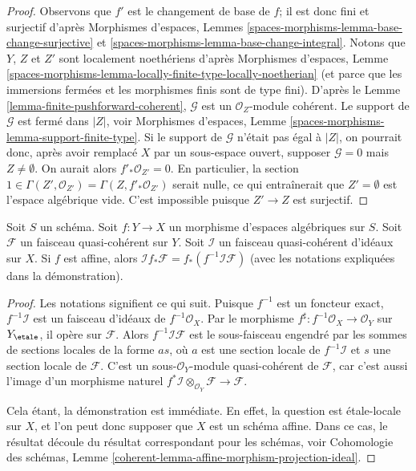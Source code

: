 \begin{proof}
Observons que $f'$ est le changement de base de $f$; il est donc fini
et surjectif d'après Morphismes d'espaces, Lemmes
\ref{spaces-morphisms-lemma-base-change-surjective} et
\ref{spaces-morphisms-lemma-base-change-integral}.
Notons que $Y$, $Z$ et $Z'$ sont localement noethériens d'après
Morphismes d'espaces, Lemme
\ref{spaces-morphisms-lemma-locally-finite-type-locally-noetherian}
(et parce que les immersions fermées et les morphismes finis
sont de type fini). D'après le Lemme \ref{lemma-finite-pushforward-coherent},
$\mathcal{G}$ est un $\mathcal{O}_Z$-module cohérent.
Le support de $\mathcal{G}$ est fermé dans $|Z|$, voir
Morphismes d'espaces, Lemme
\ref{spaces-morphisms-lemma-support-finite-type}.
Si le support de $\mathcal{G}$ n'était pas égal à $|Z|$,
on pourrait donc, après avoir remplacé $X$ par un sous-espace ouvert, supposer
$\mathcal{G} = 0$ mais $Z \not = \emptyset$.
On aurait alors $f'_*\mathcal{O}_{Z'} = 0$. En particulier, la section
$1 \in \Gamma(Z', \mathcal{O}_{Z'}) = \Gamma(Z, f'_*\mathcal{O}_{Z'})$
serait nulle, ce qui entraînerait que $Z' = \emptyset$ est l'espace
algébrique vide. C'est impossible puisque $Z' \to Z$ est surjectif.
\end{proof}

\begin{lemma}
\label{lemma-affine-morphism-projection-ideal}
Soit $S$ un schéma. Soit $f : Y \to X$ un morphisme d'espaces algébriques
sur $S$. Soit $\mathcal{F}$ un faisceau quasi-cohérent sur $Y$.
Soit $\mathcal{I}$ un faisceau quasi-cohérent d'idéaux sur $X$.
Si $f$ est affine, alors
$\mathcal{I}f_*\mathcal{F} = f_*(f^{-1}\mathcal{I}\mathcal{F})$
(avec les notations expliquées dans la démonstration).
\end{lemma}

\begin{proof}
Les notations signifient ce qui suit. Puisque $f^{-1}$ est un foncteur exact,
$f^{-1}\mathcal{I}$ est un faisceau
d'idéaux de $f^{-1}\mathcal{O}_X$. Par le morphisme
$f^\sharp : f^{-1}\mathcal{O}_X \to \mathcal{O}_Y$
sur $Y_\etale$, il opère sur $\mathcal{F}$.
Alors $f^{-1}\mathcal{I}\mathcal{F}$ est le sous-faisceau
engendré par les sommes de sections locales de la forme $as$, où $a$
est une section locale de $f^{-1}\mathcal{I}$ et $s$ une section locale
de $\mathcal{F}$. C'est un sous-$\mathcal{O}_Y$-module quasi-cohérent
de $\mathcal{F}$, car c'est aussi l'image d'un morphisme naturel
$f^*\mathcal{I} \otimes_{\mathcal{O}_Y} \mathcal{F} \to \mathcal{F}$.

\medskip\noindent
Cela étant, la démonstration est immédiate. En effet, la question est
\'etale-locale sur $X$, et l'on peut donc supposer que $X$ est un schéma affine.
Dans ce cas, le résultat découle du résultat correspondant
pour les schémas, voir Cohomologie des schémas, Lemme
\ref{coherent-lemma-affine-morphism-projection-ideal}.
\end{proof}

